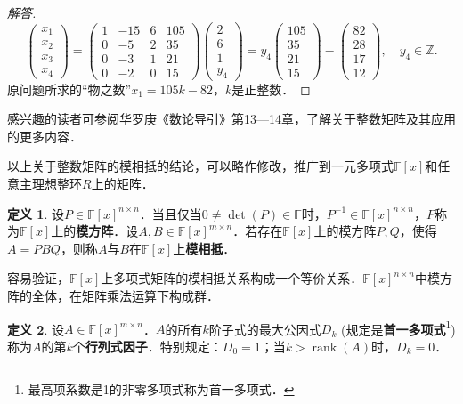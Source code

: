 \documentclass[a4paper,fontset=windows]{ctexbook}
\theoremstyle{definition}
\newtheorem{definition}{定义}[chapter]
\DeclareMathOperator{\rank}{rank}
\begin{document}
\begin{proof}[解答]
\begin{equation*}
\begin{pmatrix}x_1 \\ x_2 \\ x_3 \\ x_4\end{pmatrix}=\begin{pmatrix}1&-15&6&105 \\ 0&-5&2&35 \\ 0&-3&1&21 \\ 0&-2&0&15\end{pmatrix}\begin{pmatrix}2 \\ 6 \\ 1 \\ y_4\end{pmatrix}=y_4\begin{pmatrix}105 \\ 35 \\ 21 \\ 15\end{pmatrix}-\begin{pmatrix}82 \\ 28 \\ 17 \\ 12\end{pmatrix},\quad y_4\in\mathbb{Z}.
\end{equation*}
原问题所求的“物之数”$x_1=105k-82$，$k$是正整数．
\end{proof}

感兴趣的读者可参阅华罗庚《数论导引》第13—14章，了解关于整数矩阵及其应用的更多内容．

\medskip 以上关于整数矩阵的模相抵的结论，可以略作修改，推广到一元多项式$\mathbb{F}[x]$和任意主理想整环$R$上的矩阵．

\begin{definition}
设$P\in\mathbb{F}[x]^{n\times n}$．当且仅当$0\ne\det(P)\in\mathbb{F}$时，$P^{-1}\in\mathbb{F}[x]^{n\times n}$，$P$称为$\mathbb{F}[x]$上的{\bf 模方阵}．设$A,B\in\mathbb{F}[x]^{m\times n}$．若存在$\mathbb{F}[x]$上的模方阵$P,Q$，使得$A=PBQ$，则称$A$与$B$在$\mathbb{F}[x]$上{\bf 模相抵}．
\end{definition}

容易验证，$\mathbb{F}[x]$上多项式矩阵的模相抵关系构成一个等价关系．$\mathbb{F}[x]^{n\times n}$中模方阵的全体，在矩阵乘法运算下构成群．

\begin{definition}
设$A\in\mathbb{F}[x]^{m\times n}$．$A$的所有$k$阶子式的最大公因式$D_k$ (规定是{\bf 首一多项式}\footnote{最高项系数是1的非零多项式称为首一多项式．})称为$A$的第$k$个{\bf 行列式因子}．特别规定：$D_0=1$；当$k>\rank(A)$时，$D_k=0$．
\end{definition}
\end{document}
